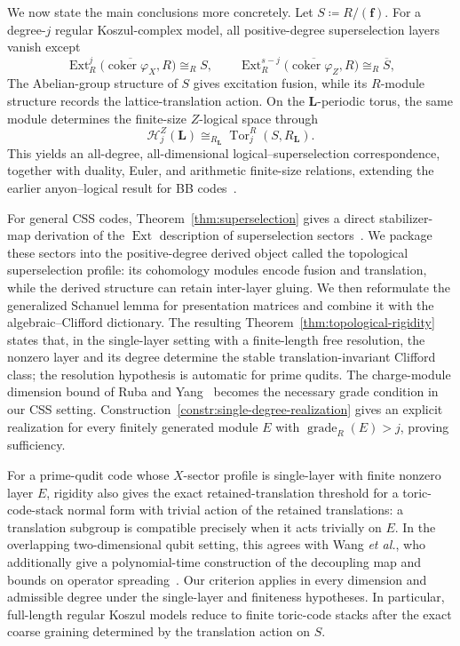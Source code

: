 \documentclass[aps,prx,english,superscriptaddress,twocolumn,tightenlines,showpacs,longbibliography,floatfix,amsfonts]{revtex4-2}
\theoremstyle{remark}
\theoremstyle{definition}
\begin{document}
	We now state the main conclusions more concretely. Let
	\(S\coloneqq R/(\mathbf f)\). For a degree-\(j\) regular Koszul-complex
	model, all positive-degree superselection layers vanish except
	\begin{equation*}
		\operatorname{Ext}_R^j
		\bigl(\overline{\operatorname{coker}\varphi_X},R\bigr)
		\cong_R S,
		\qquad
		\operatorname{Ext}_R^{s-j}
		\bigl(\overline{\operatorname{coker}\varphi_Z},R\bigr)
		\cong_R\overline S,
	\end{equation*}
	The Abelian-group structure of \(S\) gives excitation fusion, while its
	\(R\)-module structure records the lattice-translation action. On the
	\(\mathbf L\)-periodic torus, the same module determines the finite-size
	\(Z\)-logical space through
	\begin{equation*}
		\mathcal H_j^Z(\mathbf L)
		\cong_{R_{\mathbf L}}
		\operatorname{Tor}_j^R(S,R_{\mathbf L}).
	\end{equation*}
	This yields an all-degree, all-dimensional logical--superselection
	correspondence, together with duality, Euler, and arithmetic finite-size
	relations, extending the earlier anyon--logical result for BB
	codes~\cite{Chen2025PRL}.

	For general CSS codes, Theorem~\ref{thm:superselection} gives a direct
	stabilizer-map derivation of the \(\operatorname{Ext}\) description of
	superselection sectors~\cite{Yang2023}. We package these sectors into the
	positive-degree derived object called the topological superselection profile:
	its cohomology modules encode
	fusion and translation, while the derived structure can retain inter-layer
	gluing. We then reformulate the generalized Schanuel lemma for presentation
	matrices and combine it with the algebraic--Clifford dictionary. The resulting
	Theorem~\ref{thm:topological-rigidity} states that, in the single-layer setting
	with a finite-length free resolution, the nonzero layer and its degree
	determine the stable translation-invariant Clifford class; the resolution
	hypothesis is automatic for prime qudits. The charge-module dimension bound of
	Ruba and Yang~\cite[Prop.~25]{Yang2023} becomes the necessary grade condition
	in our CSS setting. Construction~\ref{constr:single-degree-realization} gives
	an explicit realization for every finitely generated module
	\(E\) with \(\operatorname{grade}_R(E)>j\), proving sufficiency.

	For a prime-qudit code whose \(X\)-sector profile is single-layer with finite
	nonzero layer \(E\), rigidity also gives the exact retained-translation
	threshold for a toric-code-stack normal form with trivial action of the
	retained translations: a translation subgroup is compatible precisely when
	it acts trivially on \(E\). In the overlapping
	two-dimensional qubit setting, this agrees with Wang \emph{et al.}, who
	additionally give a polynomial-time construction of the decoupling map and
	bounds on operator spreading~\cite{Wang2026Decoupling}. Our criterion applies
	in every dimension and admissible degree under the single-layer and finiteness
	hypotheses. In particular, full-length regular Koszul models reduce to finite
	toric-code stacks after the exact coarse graining determined by the translation
	action on \(S\).
\end{document}
